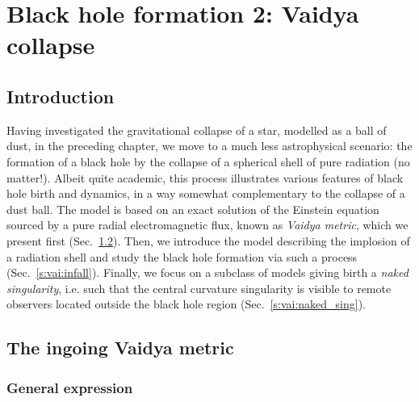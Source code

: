 \chapter{Black hole formation 2: Vaidya collapse}
\label{s:vai}

\minitoc

\section{Introduction}

Having investigated the gravitational collapse of a star, modelled as a ball of dust,
in the preceding chapter, we move to a much less astrophysical scenario: the
formation of a black hole by the collapse of a spherical shell of pure radiation
(no matter!).
Albeit quite academic, this process illustrates various features of black hole birth and dynamics,
in a way somewhat complementary to the collapse of a dust ball.
The model is based on an exact solution of the Einstein equation sourced by
a pure radial electromagnetic flux, known as \emph{Vaidya metric}, which
we present first (Sec.~\ref{s:vai:Vaidya_metric}).
Then, we introduce the
model describing the implosion of a radiation shell and
study the black hole formation via such a process (Sec.~\ref{s:vai:infall}).
Finally, we focus on a subclass of models giving birth a \emph{naked singularity}, i.e.
such that the central curvature singularity is visible to remote observers located
outside the black hole region (Sec.~\ref{s:vai:naked_sing}).


\section{The ingoing Vaidya metric} \label{s:vai:Vaidya_metric}

\subsection{General expression} \label{s:vai:general}

